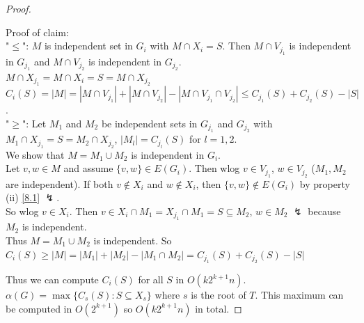 \begin{proof}
\begin{enumerate}
        \hfill
        \begin{center}
    \end{center}
        Proof of claim:\\
        "$\leq$": $M$ is independent set in $G_i$ with $M\cap X_i=S$. Then $M\cap V_{j_1}$ is independent in $G_{j_1}$ and $M\cap V_{j_2}$ is independent in $G_{j_2}$.\\
        $M\cap X_{j_1}=M\cap X_i=S=M\cap X_{j_2}$\\
        $C_i(S)=|M|=|M\cap V_{j_1}|+|M\cap V_{j_2}|-|M\cap V_{j_1}\cap V_{j_2}|\leq C_{j_1}(S)+C_{j_2}(S)-|S|$.\\
        \hfill
        "$\geq$": Let $M_1$ and $M_2$ be independent sets in $G_{j_1}$ and $G_{j_2}$ with $M_1\cap X_{j_1}=S=M_2\cap X_{j_2}$, $|M_l|=C_{j_l}(S)$ for $l=1,2$.\\
        We show that $M=M_1\cup M_2$ is independent in $G_i$.\\ 
        Let $v,w\in M$ and assume $\{v,w\}\in E(G_i)$. Then wlog $v\in V_{j_1}$, $w\in V_{j_2}$ ($M_1,M_2$ are independent). If both $v\notin X_i$ and $w\notin X_i$, then $\{v,w\}\notin E(G_i)$ by property (ii) \ref{8.1} $\lightning$.\\
        So wlog $v\in X_i$. Then $v\in X_i\cap M_1=X_{j_1}\cap M_1=S\subseteq M_2$, $w\in M_2$ $\lightning$ because $M_2$ is independent.\\
        Thus $M=M_1\cup M_2$ is independent. So $C_i(S)\geq |M|=|M_1|+|M_2|-|M_1\cap M_2|=C_{j_1}(S)+C_{j_2}(S)-|S|$     
    \end{enumerate}
    Thus we can compute $C_i(S)$ for all $S$ in $O(k2^{k+1}n)$. $\alpha(G)=\max\{C_s(S):S\subseteq X_s\}$ where $s$ is the root of $T$. This maximum can be computed in $O(2^{k+1})$ so $O(k2^{k+1}n)$ in total. 
\end{proof}
